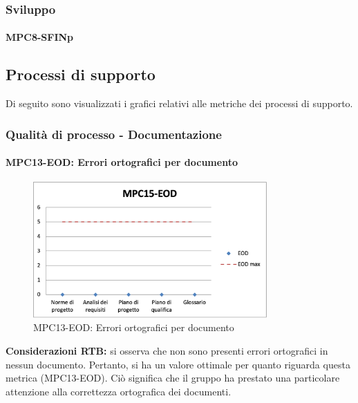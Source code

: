 \subsubsection{Sviluppo} \label{sec:sviluppo}
\paragraph{MPC8-SFINp}
\subsection{Processi di supporto} \label{sec:processi_di_supporto}
Di seguito sono visualizzati i grafici relativi alle metriche dei processi di supporto.
\subsubsection{Qualità di processo - Documentazione}
\paragraph{MPC13-EOD: Errori ortografici per documento}
\begin{figure}[h!] 
    \centering
    \includegraphics[width=0.8\textwidth]{images/MPC13-EOD.png}
    \caption{MPC13-EOD: Errori ortografici per documento}
\end{figure}
\noindent \textbf{Considerazioni RTB:} si osserva che non sono presenti errori ortografici in nessun documento. Pertanto, si ha un valore ottimale per quanto riguarda questa metrica (MPC13-EOD). Ciò significa che il gruppo ha prestato una particolare attenzione alla correttezza ortografica dei documenti.


